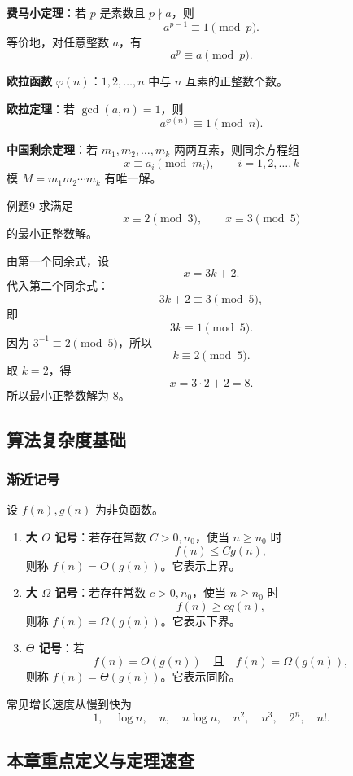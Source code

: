\textbf{费马小定理}：若 \(p\) 是素数且 \(p\nmid a\)，则
\[
a^{p-1}\equiv1\pmod p.
\]
等价地，对任意整数 \(a\)，有
\[
a^p\equiv a\pmod p.
\]

\textbf{欧拉函数} \(\varphi(n)\)：\(1,2,\dots,n\) 中与 \(n\) 互素的正整数个数。

\textbf{欧拉定理}：若 \(\gcd(a,n)=1\)，则
\[
a^{\varphi(n)}\equiv1\pmod n.
\]

\textbf{中国剩余定理}：若 \(m_1,m_2,\dots,m_k\) 两两互素，则同余方程组
\[
x\equiv a_i\pmod {m_i},\qquad i=1,2,\dots,k
\]
模 \(M=m_1m_2\cdots m_k\) 有唯一解。

\begin{question}{例题9}
	求满足
	\[
	x\equiv2\pmod3,\qquad x\equiv3\pmod5
	\]
	的最小正整数解。
	
	\begin{solution}
	由第一个同余式，设
	\[
	x=3k+2.
	\]
	代入第二个同余式：
	\[
	3k+2\equiv3\pmod5,
	\]
	即
	\[
	3k\equiv1\pmod5.
	\]
	因为 \(3^{-1}\equiv2\pmod5\)，所以
	\[
	k\equiv2\pmod5.
	\]
	取 \(k=2\)，得
	\[
	x=3\cdot2+2=8.
	\]
	所以最小正整数解为 \(8\)。
	\end{solution}
\end{question}

\subsection{算法复杂度基础}

\subsubsection{渐近记号}

设 \(f(n),g(n)\) 为非负函数。
\begin{enumerate}
	\item \textbf{大 \(O\) 记号}：若存在常数 \(C>0,n_0\)，使当 \(n\ge n_0\) 时
	\[
	f(n)\le Cg(n),
	\]
	则称 \(f(n)=O(g(n))\)。它表示上界。
	\item \textbf{大 \(\Omega\) 记号}：若存在常数 \(c>0,n_0\)，使当 \(n\ge n_0\) 时
	\[
	f(n)\ge cg(n),
	\]
	则称 \(f(n)=\Omega(g(n))\)。它表示下界。
	\item \textbf{\(\Theta\) 记号}：若
	\[
	f(n)=O(g(n))\quad\text{且}\quad f(n)=\Omega(g(n)),
	\]
	则称 \(f(n)=\Theta(g(n))\)。它表示同阶。
\end{enumerate}

常见增长速度从慢到快为
\[
1,\quad \log n,\quad n,\quad n\log n,\quad n^2,\quad n^3,\quad 2^n,\quad n!.
\]

\subsection{本章重点定义与定理速查}

